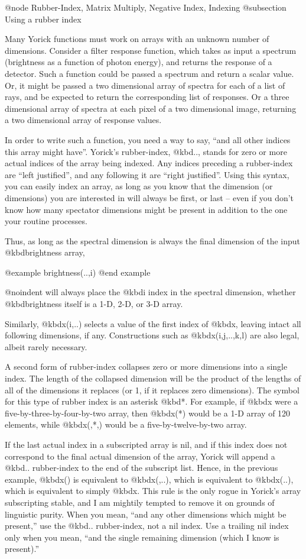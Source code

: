@node    Rubber-Index, Matrix Multiply, Negative Index, Indexing
@subsection Using a rubber index

Many Yorick functions must work on arrays with an unknown number of
dimensions.  Consider a filter response function, which takes as input a
spectrum (brightness as a function of photon energy), and returns the
response of a detector.  Such a function could be passed a spectrum and
return a scalar value.  Or, it might be passed a two dimensional array
of spectra for each of a list of rays, and be expected to return the
corresponding list of responses.  Or a three dimensional array of
spectra at each pixel of a two dimensional image, returning a two
dimensional array of response values.

In order to write such a function, you need a way to say, ``and all other
indices this array might have''.  Yorick's rubber-index, @kbd{..}, stands
for zero or more actual indices of the array being indexed.  Any indices
preceding a rubber-index are ``left justified'', and any following it are
``right justified''.  Using this syntax, you can easily index an array, as
long as you know that the dimension (or dimensions) you are interested
in will always be first, or last -- even if you don't know how many
spectator dimensions might be present in addition to the one your
routine processes.

Thus, as long as the spectral dimension is always the final dimension
of the input @kbd{brightness} array,

@example
brightness(..,i)
@end example

@noindent
will always place the @kbd{i} index in the spectral dimension, whether
@kbd{brightness} itself is a 1-D, 2-D, or 3-D array.

Similarly, @kbd{x(i,..)} selects a value of the first index of @kbd{x},
leaving intact all following dimensions, if any.  Constructions such as
@kbd{x(i,j,..,k,l)} are also legal, albeit rarely necessary.

A second form of rubber-index collapses zero or more dimensions into a
single index.  The length of the collapsed dimension will be the product
of the lengths of all of the dimensions it replaces (or 1, if it
replaces zero dimensions).  The symbol for this type of rubber index is
an asterisk @kbd{*}.  For example, if @kbd{x} were a
five-by-three-by-four-by-two array, then @kbd{x(*)} would be a 1-D array
of 120 elements, while @kbd{x(,*,)} would be a five-by-twelve-by-two
array.

If the last actual index in a subscripted array is nil, and if this
index does not correspond to the final actual dimension of the array,
Yorick will append a @kbd{..} rubber-index to the end of the subscript
list.  Hence, in the previous example, @kbd{x()} is equivalent to
@kbd{x(,..)}, which is equivalent to @kbd{x(..)}, which is equivalent to
simply @kbd{x}.  This rule is the only rogue in Yorick's array
subscripting stable, and I am mightily tempted to remove it on grounds
of linguistic purity.  When you mean, ``and any other dimensions which
might be present,'' use the @kbd{..} rubber-index, not a nil index.  Use
a trailing nil index only when you mean, ``and the single remaining
dimension (which I know is present).''



